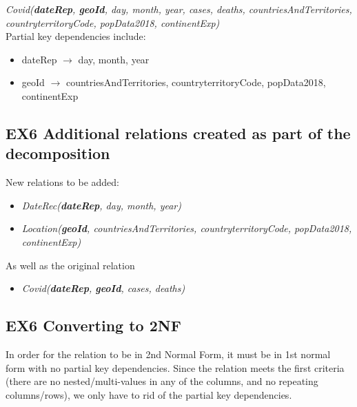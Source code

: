 \documentclass{report}
\begin{document}
\textit{Covid(\textbf{dateRep}, \textbf{geoId}, day, month, year, cases, deaths, countriesAndTerritories, countryterritoryCode, \indent\indent\indent popData2018, continentExp)} \\

Partial key dependencies include:
\begin{itemize}
    \item dateRep $\rightarrow$ day, month, year
    \item geoId $\rightarrow$ countriesAndTerritories, countryterritoryCode, popData2018, continentExp
\vspace{2mm}
\end{itemize}

\subsection*{EX6 Additional relations created as part of the decomposition}
New relations to be added:
\begin{itemize}
    \item \textit{DateRec(\textbf{dateRep}, day, month, year)}
    \item \textit{Location(\textbf{geoId}, countriesAndTerritories, countryterritoryCode, popData2018, continentExp)}
\end{itemize}
    As well as the original relation
\begin{itemize}
    \item \textit{Covid(\textbf{dateRep}, \textbf{geoId}, cases, deaths)}
\end{itemize}
\vspace{2mm}

\subsection*{EX6 Converting to 2NF}
In order for the relation to be in 2nd Normal Form, it must be in 1st normal form with no partial key dependencies. Since the relation meets the first criteria (there are no nested/multi-values in any of the columns, and no repeating columns/rows), we only have to rid of the partial key dependencies. \\
\end{document}
